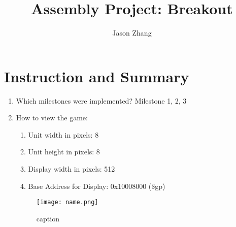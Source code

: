\documentclass{article}
\title{Assembly Project: Breakout}
\author{Jason Zhang}
\begin{document}
\maketitle

\section{Instruction and Summary}

\begin{enumerate}

    \item Which milestones were implemented? 
    Milestone 1, 2, 3

    \item How to view the game:
    
    \begin{enumerate}

    \item Unit width in pixels:       8
    \item Unit height in pixels:      8
    \item Display width in pixels:    512
    \item Base Address for Display:   0x10008000 (\$gp)


    \end{enumerate}

    

\begin{figure}[ht!]
    \centering
    \texttt{[image: name.png]}
    \caption{caption}
    \label{Instructions}
\end{figure}


\end{enumerate}
\end{document}
